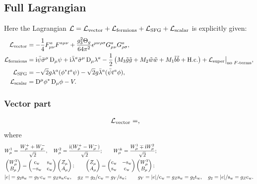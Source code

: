 \documentclass[CheatSheet]{subfiles}
\begin{document}
\subsection{Full Lagrangian}
Here the Lagrangian
 $\mathcal L = \mathcal L_{\mathrm{vector}} + \mathcal L_{\mathrm{fermions}} + \mathcal L_{\mathrm{SFG}} + \mathcal L_{\mathrm{scalar}}$ is explicitly given:
\begin{align}
 \mathcal L_{\mathrm{vector}}&=
- \frac14F^a_{\mu\nu}F^{a\mu\nu}
+ \frac{g_3^2\Theta_g}{64\pi^2}\epsilon^{\mu\nu\rho\sigma}G^a_{\mu\nu}G^a_{\rho\sigma},
\\
 \mathcal L_{\mathrm{fermions}}&=
  \mathrm{i}\bar\psi\bar\sigma^\mu\mathop{}\!\mathrm{D}_\mu\psi
 + \mathrm{i}\bar\lambda^a\bar\sigma^\mu\mathop{}\!\mathrm{D}_\mu\lambda^a
 - \frac12\left(M_3\tilde g\tilde g+M_2\tilde w\tilde w+M_1\tilde b\tilde b+\text{H.c.}\right)
 + \mathcal L_{\mathrm{super}}\big|_{\text{no $F$-terms}},
\\\mathcal L_{\mathrm{SFG}}&=
 -\sqrt2g\lambda^a(\phi^*t^a\psi) -\sqrt2g\bar\lambda^a(\bar\psi t^a\phi),
\\\mathcal L_{\mathrm{scalar}}&=
\mathop{}\!\mathrm{D}^\mu\phi^*\mathop{}\!\mathrm{D}_\mu\phi - V.
\end{align}
\subsubsection{Vector part}
\begin{align}
\begin{split}
   \mathcal L_{\mathrm{vector}}
 &=
 ,
\end{split}
\end{align}
where
\begin{align*}
 &W^1_\mu = \frac{W^+_\mu+W^-_\mu}{\sqrt2},\quad
 W^2_\mu = \frac{\mathrm{i}(W^+_\mu-W^-_\mu)}{\sqrt2};\qquad
 W^\pm_\mu = \frac{W^1_\mu\mp\mathrm{i} W^2_\mu}{\sqrt2};
\\
 &\begin{pmatrix}W^3_\mu\\B_\mu\end{pmatrix} = \begin{pmatrix}\mathrm{c}_{\mathrm w} & \mathrm{s}_{\mathrm w} \\ -\mathrm{s}_{\mathrm w} & \mathrm{c}_{\mathrm w}\end{pmatrix} \begin{pmatrix}Z_\mu \\ A_\mu\end{pmatrix};\qquad
 \begin{pmatrix}Z_\mu\\A_\mu\end{pmatrix} = \begin{pmatrix}\mathrm{c}_{\mathrm w} & -\mathrm{s}_{\mathrm w} \\ \mathrm{s}_{\mathrm w} & \mathrm{c}_{\mathrm w}\end{pmatrix} \begin{pmatrix}W^3_\mu \\ B_\mu\end{pmatrix};\\
 &|e| = g_2\mathrm{s}_{\mathrm w} = g_Y\mathrm{c}_{\mathrm w} = g_Z\mathrm{s}_{\mathrm w}\mathrm{c}_{\mathrm w}, \quad
 g_Z  = g_2/\mathrm{c}_{\mathrm w} = g_Y/\mathrm{s}_{\mathrm w}; \qquad
 g_Y = |e|/\mathrm{c}_{\mathrm w} = g_Z\mathrm{s}_{\mathrm w} = g_2{\mathrm t}_{\mathrm w},\quad
 g_2 = |e|/\mathrm{s}_{\mathrm w} = g_Z\mathrm{c}_{\mathrm w}.
\end{align*}
\end{document}
